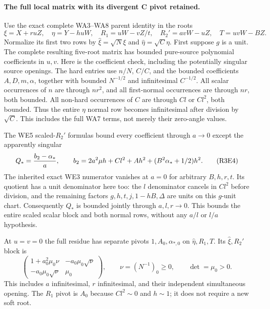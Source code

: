 \paragraph{The full local matrix with its divergent C pivot retained.}
Use the exact complete WA3--WA8 parent identity in the roots
\[
 \xi=X+ruZ,\quad \eta=Y-huW,\quad
 R_1=uW-vZ/t,\quad R_2'=avW-uZ,\quad T=uvW-BZ.
\]
Normalize its first two rows by
$\widehat\xi=\sqrt N\xi$ and $\widehat\eta=\sqrt C\eta$.
First suppose $g$ is a unit. The complete resulting five-root
matrix has bounded pure-source polynomial coefficients in $u,v$.
Here is the coefficient check, including the potentially singular
source openings. The hard entries use $n/N$, $C/C$, and the bounded
coefficients $A,D,m,\alpha$, together with bounded $N^{-1/2}$ and
infinitesimal $C^{-1/2}$. All scalar occurrences of $n$ are through
$nr^2$, and all first-normal occurrences are through $nr$, both
bounded. All non-hard occurrences of $C$ are through $Cl$ or
$Cl^2$, both bounded. Thus the entire $\eta$ normal row becomes
infinitesimal after division by $\sqrt C$. This includes the full
WA7 terms, not merely their zero-angle values.

The WE5 scaled-$R_2'$ formulas bound every coefficient through
$a\to0$ except the apparently singular
\[
 Q_*={b_2-\alpha_*\over a},\qquad
 b_2=2a^2\mu h+Cl^2+Ah^2+(B^2\alpha_*+1/2)h^2.  \tag{R3E4}
\]
The inherited exact WE3 numerator vanishes at $a=0$ for arbitrary
$B,h,r,t$. Its quotient has a unit denominator here too: the $l$
denominator cancels in $Cl^2$ before division, and the remaining
factors $g,h,t,j,1-hB,\Delta$ are units on this $g$-unit chart.
Consequently $Q_*$ is bounded jointly through $a,l,r\to0$.
This bounds the entire scaled scalar block and both normal rows,
without any $a/l$ or $l/a$ hypothesis.

At $u=v=0$ the full residue has separate pivots $1,A_0,\alpha_{*,0}$
on $\widehat\eta,R_1,T$. Its $\widehat\xi,R_2'$ block is
\[
 \begin{pmatrix}
 1+a_0^2\mu_0\nu&-a_0\mu_0\sqrt\nu\\
 -a_0\mu_0\sqrt\nu&\mu_0
 \end{pmatrix},\qquad
 \nu=(N^{-1})_0\ge0,\qquad \det=\mu_0>0.          \tag{R3E5}
\]
This includes $a$ infinitesimal, $r$ infinitesimal, and their
independent simultaneous opening. The $R_1$ pivot is $A_0$ because
$Cl^2\sim0$ and $h\sim1$; it does not require a new soft root.

